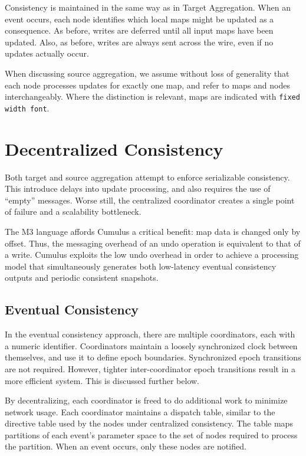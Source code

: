 \documentclass{vldb}
\begin{document}
Consistency is maintained in the same way as in Target Aggregation.  When an event occurs, each node identifies which local maps might be updated as a consequence.  As before, writes are deferred until all input maps have been updated.  Also, as before, writes are always sent across the wire, even if no updates actually occur.  

When discussing source aggregation, we assume without loss of generality that each node processes updates for exactly one map, and refer to maps and nodes interchangeably.  Where the distinction is relevant, maps are indicated with \texttt{fixed width font}.

\section{Decentralized Consistency}
Both target and source aggregation attempt to enforce serializable consistency.  This introduce delays into update processing, and also requires the use of ``empty'' messages.  Worse still, the centralized coordinator creates a single point of failure and a scalability bottleneck.  

The M3 language affords Cumulus a critical benefit: map data is changed only by offset.  Thus, the messaging overhead of an undo operation is equivalent to that of a write.  Cumulus exploits the low undo overhead in order to achieve a processing model that simultaneously generates both low-latency eventual consistency outputs and periodic consistent snapshots.  

\subsection{Eventual Consistency}
\label{sec:eventualconsistency}
In the eventual consistency approach, there are multiple coordinators, each with a numeric identifier.  Coordinators maintain a loosely synchronized clock between themselves, and use it to define epoch boundaries.  Synchronized epoch transitions are not required.  However, tighter inter-coordinator epoch transitions result in a more efficient system.  This is discussed further below.

By decentralizing, each coordinator is freed to do additional work to minimize network usage.  Each coordinator maintains a dispatch table, similar to the directive table used by the nodes under centralized consistency.  The table maps  partitions of each event's parameter space to the set of nodes required to process the partition.  When an event occurs, only these nodes are notified.
\end{document}
